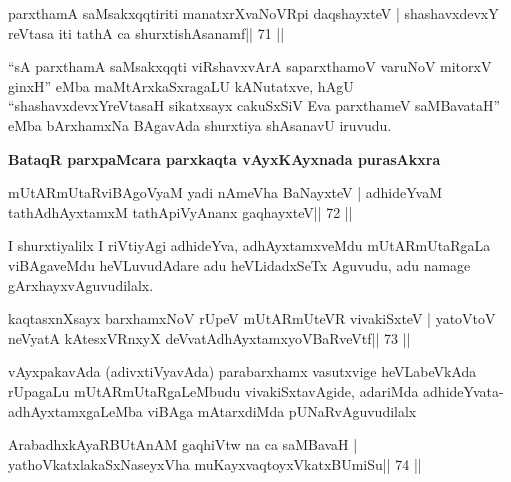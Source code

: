 
\begin{shl}
parxthamA saMsakxqqtiriti manatxrXvaNoVR\s pi daqshayxteV |
shashavxdevxY reVtasa iti tathA ca shurxtishAsanamf\hfill || 71 ||
\end{shl}

\begin{artha}
``sA parxthamA saMsakxqqti viRshavxvArA saparxthamoV varuNoV mitorxV\s
  ginxH'' eMba maMtArxkaSxragaLU kANutatxve, hAgU
  ``shashavxdevxYreVtasaH sikatxsayx cakuSxSiV Eva parxthameV
  saMBavataH'' eMba bArxhamxNa BAgavAda shurxtiya shAsanavU iruvudu.
\end{artha}

\begin{center}
\textbf{BataqR parxpaMcara parxkaqta vAyxKAyxnada purasAkxra}
\end{center}



\begin{shl}
mUtARmUtaRviBAgoV\s yaM yadi nAmeVha BaNayxteV |
adhideYvaM tathA\s dhAyxtamxM tathA\s piVyAnanx gaqhayxteV\hfill || 72 ||
\end{shl}

\begin{artha}
I shurxtiyalilx I riVtiyAgi adhideYva, adhAyxtamxveMdu mUtARmUtaRgaLa viBAgaveMdu heVLuvudAdare adu heVLidadxSeTx Aguvudu, adu namage gArxhayxvAguvudilalx.
\end{artha}



\begin{shl}
kaqtasxnXsayx barxhamxNoV rUpeV mUtARmUteVR vivakiSxteV |
yatoV\s toV neVyatA kAtesxVRnxyX deVvatAdhAyxtamxyoVBaRveVtf\hfill || 73 ||
\end{shl}

\begin{artha}
vAyxpakavAda (adivxtiVyavAda) parabarxhamx vasutxvige heVLabeVkAda
rUpagaLu mUtARmUtaRgaLeMbudu vivakiSxtavAgide, adariMda
adhideYvata-adhAyxtamxgaLeMba viBAga mAtarxdiMda pUNaRvAguvudilalx
\end{artha}

\begin{shl}
ArabadhxkAyaRBUtAnAM gaqhiVtw na ca saMBavaH |
yathoVkatxlakaSxNaseyxVha muKayxvaqtoyxVkatxBUmiSu\hfill || 74 ||
\end{shl}

